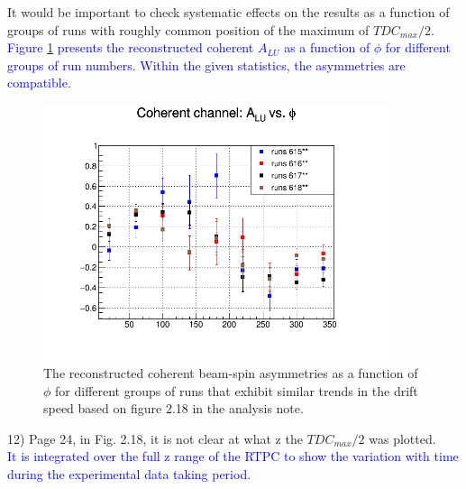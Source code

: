 It would be important to check systematic effects on the results as a function 
of groups of runs with roughly common position of the maximum of 
$TDC_{max}/2$.\\
\textcolor{blue}{ Figure \ref{fig:coh_alu_run} presents the reconstructed
   coherent $A_{LU}$ as a function of $\phi$ for different groups of run 
numbers. Within the given statistics, the asymmetries are compatible. }\\
\begin{figure}[tbp]
   \centering
   \includegraphics[height=7.5cm]{fig/bsa_coherent_runs.png}
   \caption{The reconstructed coherent beam-spin asymmetries as a function of 
   $\phi$ for different groups of runs that exhibit similar trends in the drift 
speed based on figure 2.18 in the analysis note.  }
   \label{fig:coh_alu_run}
    \end{figure}


12) Page 24, in Fig. 2.18, it is not clear at what z the $TDC_{max}/2$ was 
plotted.\\
\textcolor{blue}{ It is integrated over the full z range of the RTPC to show 
the variation with time during the experimental data taking period.}\\

